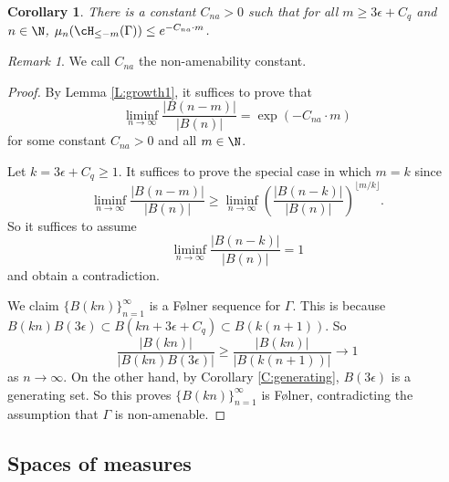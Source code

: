\documentclass[12pt]{article}
\theoremstyle{plain}
\newtheorem{cor}[thm]{Corollary}
\theoremstyle{definition}
\theoremstyle{remark}
\newtheorem{remark}{Remark}
\newcommand{\G}{\Gamma}
\newcommand{\eps}{\epsilon}
\begin{document}
\begin{cor}\label{C:non-amenable}
There is a constant $C_{na}>0$ such that  for all $m \ge 3\eps+C_q$ and $n \in \N$, $\mu_n(\cH_{\le -m}(\G))\le e^{-C_{na}\cdot m}$.   
\end{cor}

\begin{remark}
    We call $C_{na}$ the non-amenability constant.
\end{remark}



\begin{proof}
   By Lemma \ref{L:growth1}, it suffices to prove that 
   $$\liminf_{n\to\infty} \frac{|B(n-m)|}{|B(n)|}=\exp(-C_{na}\cdot m)$$
   for some constant $C_{na}>0$ and all $m \in \N$. 

   Let $k=3\eps+C_q \ge 1$.    It suffices to prove the special case in which $m=k$ since
   $$\liminf_{n\to\infty} \frac{|B(n-m)|}{|B(n)|} \ge \liminf_{n\to\infty}\left(\frac{|B(n-k)|}{|B(n)|}\right)^{\lfloor m/k \rfloor}.$$
   So it suffices to assume 
    $$\liminf_{n\to\infty} \frac{|B(n-k)|}{|B(n)|}=1$$
    and obtain a contradiction.
   
   We claim $\{B(kn)\}_{n=1}^\infty$ is a F\o lner sequence for $\G$. This is because $B(kn)B(3\eps) \subset B(kn+3\eps + C_q) \subset B(k(n+1))$. So 
$$\frac{|B(kn)|}{|B(kn)B(3\eps)|} \ge \frac{|B(kn)|}{|B(k(n+1))|}\to 1$$
as $n\to\infty$. On the other hand, by Corollary \ref{C:generating}, $B(3\eps)$ is a generating set. So this proves $\{B(kn)\}_{n=1}^\infty$ is F\o lner, contradicting the assumption that $\G$ is non-amenable.
\end{proof}




\subsection{Spaces of measures}
\end{document}

